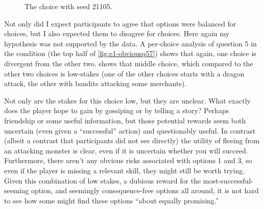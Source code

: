 \begin{figure}[!p]
\centering
{}
\caption[``Obvious'' choice 21105]{The \obv{} choice with seed 21105.}
  \label{fig:e1-seed-21105}
\end{figure}


Not only did I expect participants to agree that options were balanced for \dlm{} choices, but I also expected them to disagree for \obv{} choices.
%
Here again my hypothesis was not supported by the data.
%
A per-choice analysis of question 5 in the \obv{} condition (the top half of \cref{fig:e1-obviousq57}) shows that again, one choice is divergent from the other two.
%
 shows that middle choice, which compared to the other two \obv{} choices is low-stakes (one of the other choices starts with a dragon attack, the other with bandits attacking some merchants).



Not only are the stakes for this choice low, but they are unclear.
%
What exactly does the player hope to gain by gossiping or by telling a story?
%
Perhaps friendship or some useful information, but those potential rewards seem both uncertain (even given a ``successful'' action) and questionably useful.
%
In contrast (albeit a contrast that participants did not see directly) the utility of fleeing from an attacking monster is clear, even if it is uncertain whether you will succeed.
%
Furthermore, there aren't any obvious risks associated with options 1 and 3, so even if the player is missing a relevant skill, they might still be worth trying.
%
Given this combination of low stakes, a dubious reward for the most-successful-seeming option, and seemingly consequence-free options all around, it is not hard to see how some might find these options ``about equally promising.''


